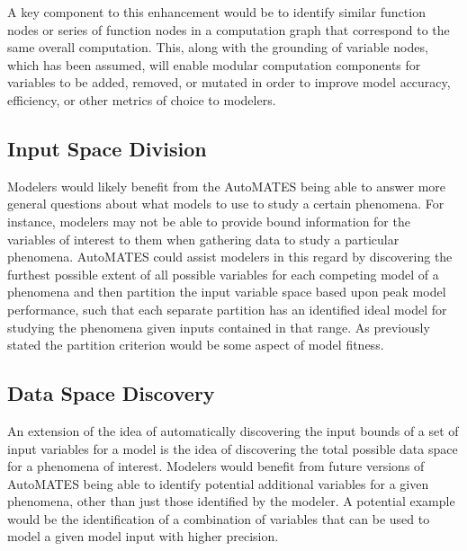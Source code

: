 A key component to this enhancement would be to identify similar function nodes or series of function nodes in a computation graph that correspond to the same overall computation. This, along with the grounding of variable nodes, which has been assumed, will enable modular computation components for variables to be added, removed, or mutated in order to improve model accuracy, efficiency, or other metrics of choice to modelers.

\subsection{Input Space Division\label{sec:auto_isd}}
Modelers would likely benefit from the AutoMATES being able to answer more general questions about what models to use to study a certain phenomena. For instance, modelers may not be able to provide bound information for the variables of interest to them when gathering data to study a particular phenomena. AutoMATES could assist modelers in this regard by discovering the furthest possible extent of all possible variables for each competing model of a phenomena and then partition the input variable space based upon peak model performance, such that each separate partition has an identified ideal model for studying the phenomena given inputs contained in that range. As previously stated the partition criterion would be some aspect of model fitness.

\subsection{Data Space Discovery\label{sec:auto_dsd}}
An extension of the idea of automatically discovering the input bounds of a set of input variables for a model is the idea of discovering the total possible data space for a phenomena of interest. Modelers would benefit from future versions of AutoMATES being able to identify potential additional variables for a given phenomena, other than just those identified by the modeler. A potential example would be the identification of a combination of variables that can be used to model a given model input with higher precision.
